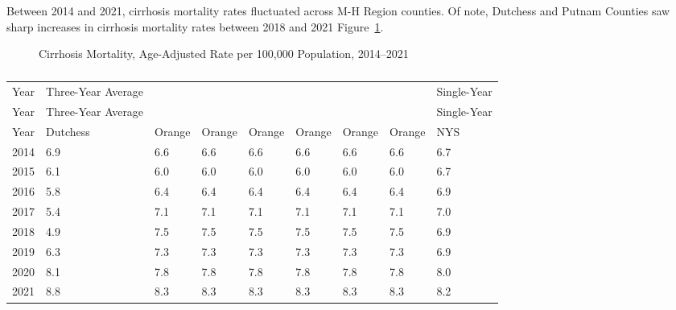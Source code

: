 \documentclass[
  english,
  letterpaper,
]{report}
\begin{document}
Between 2014 and 2021, cirrhosis mortality rates fluctuated across M-H
Region counties. Of note, Dutchess and Putnam Counties saw sharp
increases in cirrhosis mortality rates between 2018 and 2021
Figure~\ref{fig-cirrhosis-mortal-aar}.

\begin{figure}


\caption{\label{fig-cirrhosis-mortal-aar}Cirrhosis Mortality,
Age-Adjusted Rate per 100,000 Population, 2014--2021}

\end{figure}%

\begin{longtable}[]{@{}lllllllll@{}}

\caption{\label{tbl-cirrhosis-mortal-aar}Cirrhosis Mortality,
Age-Adjusted Rate per 100,000 Population, 2014--2021}

\tabularnewline

\caption{}\label{T_bf92e}\tabularnewline
\toprule\noalign{}
Year & Three-Year Average & & & & & & & Single-Year \\
\midrule\noalign{}
\endfirsthead
\toprule\noalign{}
Year & Three-Year Average & & & & & & & Single-Year \\
\midrule\noalign{}
\endhead
\bottomrule\noalign{}
\endlastfoot
Year & Dutchess & Orange & Orange & Orange & Orange & Orange & Orange &
NYS \\
2014 & 6.9 & 6.6 & 6.6 & 6.6 & 6.6 & 6.6 & 6.6 & 6.7 \\
2015 & 6.1 & 6.0 & 6.0 & 6.0 & 6.0 & 6.0 & 6.0 & 6.7 \\
2016 & 5.8 & 6.4 & 6.4 & 6.4 & 6.4 & 6.4 & 6.4 & 6.9 \\
2017 & 5.4 & 7.1 & 7.1 & 7.1 & 7.1 & 7.1 & 7.1 & 7.0 \\
2018 & 4.9 & 7.5 & 7.5 & 7.5 & 7.5 & 7.5 & 7.5 & 6.9 \\
2019 & 6.3 & 7.3 & 7.3 & 7.3 & 7.3 & 7.3 & 7.3 & 6.9 \\
2020 & 8.1 & 7.8 & 7.8 & 7.8 & 7.8 & 7.8 & 7.8 & 8.0 \\
2021 & 8.8 & 8.3 & 8.3 & 8.3 & 8.3 & 8.3 & 8.3 & 8.2 \\

\end{longtable}
\end{document}
